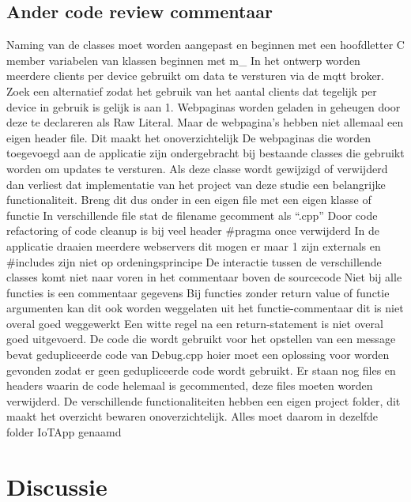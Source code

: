 			\section{Ander code review commentaar}
			
			Naming van de classes moet worden aangepast en beginnen met een hoofdletter C 
			member variabelen van klassen beginnen met m\_ 
			In het ontwerp worden meerdere clients per device gebruikt om data te versturen via de mqtt broker. Zoek een alternatief zodat het gebruik van het aantal clients dat tegelijk per device in gebruik is gelijk is aan 1. 
			Webpaginas worden geladen in geheugen door deze te declareren als Raw Literal. Maar de webpagina's hebben niet allemaal een eigen header file. Dit maakt het onoverzichtelijk 
			De webpaginas die worden toegevoegd aan de applicatie zijn ondergebracht  bij bestaande classes die gebruikt worden om updates te versturen. Als deze classe wordt gewijzigd of verwijderd dan verliest dat implementatie van het project van deze studie een belangrijke functionaliteit. Breng dit dus onder in een eigen file met een eigen klasse of functie 
			In verschillende file stat de filename gecomment als “.cpp” 
			Door code refactoring of code cleanup is bij veel header #pragma once verwijderd 
			In de applicatie draaien meerdere webservers dit mogen er maar 1 zijn 
			externals en #includes zijn niet op ordeningsprincipe De interactie tussen de verschillende classes komt niet naar voren in het commentaar boven de sourcecode 
			Niet bij alle functies is een commentaar gegevens 
			Bij functies zonder return value of functie argumenten kan dit ook worden weggelaten uit het functie-commentaar dit is niet overal goed weggewerkt 
			Een witte regel na een return-statement is niet overal goed uitgevoerd. 
			De code die wordt gebruikt voor het opstellen van een message bevat gedupliceerde code van Debug.cpp hoier moet een oplossing voor worden gevonden zodat er geen gedupliceerde code wordt gebruikt. 
			Er staan nog files en headers waarin de code helemaal is gecommented, deze files moeten worden verwijderd. 
			De verschillende functionaliteiten hebben een eigen project folder, dit maakt het overzicht bewaren onoverzichtelijk. Alles moet daarom in dezelfde folder IoTApp genaamd 
			
			
			
			
			\chapter{Discussie}
			
